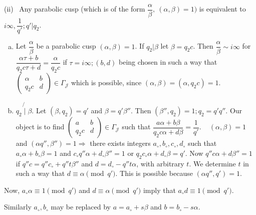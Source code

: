(ii)~ Any parabolic cusp (which is of the form
$\dfrac{\alpha}{\beta},~ (\alpha, \beta) = 1)$ is equivalent to $i
\infty, \dfrac{1}{q'}; q'|q_2$. 
\begin{enumerate}[(a)]
\item Let $\dfrac{\alpha}{\beta}$ be a parabolic cusp $(\alpha,
  \beta)=1$. If $q_2|\beta$ let $\beta = q_2 c$. Then
  $\dfrac{\alpha}{\beta} \sim i \infty$ for $\dfrac{\alpha \tau +
    b}{q_2 c \tau + d} = \dfrac{\alpha}{q_2c}$ if $\tau = i \infty;
  (b,d)$ being chosen in such a way that $\begin{pmatrix} \alpha & b
    \\ q_2c & d \end{pmatrix} \in \Gamma_\mathcal{J}$ which is
  possible, since $(\alpha, \beta) = (\alpha, q_2 c) =1$. 
\item $q_2 \not{\mid} \beta$. Let $(\beta, q_2) = q'$ and $\beta = q'
  \beta''$. Then $(\beta'', q_2) = 1; q_2 = q'q''$. Our object is to
  find $\begin{pmatrix} a & b \\ q_2c & d \end{pmatrix} \in
  \Gamma_\mathcal{J}$ such that $\dfrac{a \alpha + b \beta}{q_2 c
    \alpha + d \beta}= \dfrac{1}{q'}$. ~ $(\alpha, \beta) = 1$ and $(
  \alpha q'', \beta'') = 1 \Rightarrow$ there exists integers
  $a_\circ, b_\circ, c_\circ, d_\circ$ such that $a_\circ \alpha +
  b_\circ \beta = 1$ and $c_\circ q'' \alpha + d_\circ \beta''=1$ or\pageoriginale
  $q_2 c_\circ \alpha + d_\circ \beta = q'$. Now $q'' c \alpha + d
  \beta'' = 1$ if $q'' c = q'' c_\circ + q'' t \beta''$ and $d =
  d_\circ - q'' t \alpha$, with arbitrary $t$. We determine $t$ in
  such a way that $d \equiv \alpha \pmod {q'}$. This is possible
  because $(\alpha q'', q')=1$. 
\end{enumerate}

Now, $a_\circ \alpha \equiv 1 \pmod {q'}$ and $d \equiv \alpha \pmod
{q'}$ imply that $a_\circ d \equiv 1 \pmod {q'}$. 

Similarly $a_\circ, b_\circ$ may be replaced by $a =a_\circ + s \beta$
and $b = b_\circ - s \alpha$.  

